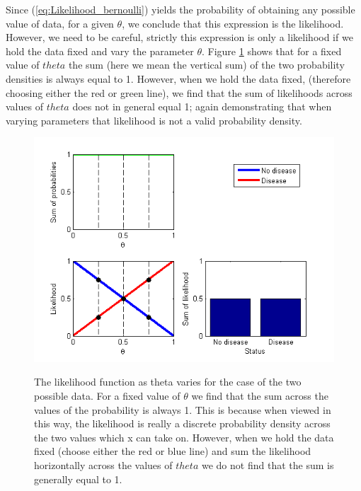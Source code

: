 \documentclass[11pt,fullpage]{book}
\begin{document}
Since (\ref{eq:Likelihood_bernoulli}) yields the probability of obtaining any possible value of data, for a given $\theta$, we conclude that this expression is the likelihood. However, we need to be careful, strictly this expression is only a likelihood if we hold the data fixed and vary the parameter $\theta$. Figure \ref{fig:Likelihood_bernoulli} shows that for a fixed value of $theta$ the sum (here we mean the vertical sum) of the two probability densities is always equal to 1. However, when we hold the data fixed, (therefore choosing either the red or green line), we find that the sum of likelihoods across values of $theta$ does not in general equal 1; again demonstrating that when varying parameters that likelihood is not a valid probability density.

\begin{figure}
\centering
\scalebox{0.75} 
{\includegraphics{likelihood_bernoulli.png}}
\caption{The likelihood function as theta varies for the case of the two possible data. For a fixed value of $\theta$ we find that the sum across the values of the probability is always 1. This is because when viewed in this way, the likelihood is really a discrete probability density across the two values which x can take on. However, when we hold the data fixed (choose either the red or blue line) and sum the likelihood horizontally across the values of $theta$ we do not find that the sum is generally equal to 1. }\label{fig:Likelihood_bernoulli}
\end{figure}
\end{document}
